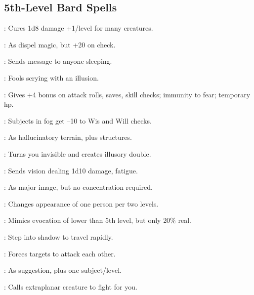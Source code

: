 \begin{multicols}{2}
\subsection{5th-Level Bard Spells}
\begin{description*}
\item[\linkspell{Cure Light Wounds, Mass}:] Cures 1d8 damage +1/level for many creatures.
\item[\linkspell{Dispel Magic, Greater}:] As dispel magic, but +20 on check.
\item[\linkspell{Dream}:] Sends message to anyone sleeping.
\item[\linkspell{False Vision}:] Fools scrying with an illusion.
\item[\linkspell{Heroism, Greater}:] Gives +4 bonus on attack rolls, saves, skill checks; immunity to fear; temporary hp.
\item[\linkspell{Mind Fog}:] Subjects in fog get –10 to Wis and Will checks.
\item[\linkspell{Mirage Arcana}:] As hallucinatory terrain, plus structures.
\item[\linkspell{Mislead}:] Turns you invisible and creates illusory double.
\item[\linkspell{Nightmare}:] Sends vision dealing 1d10 damage, fatigue.
\item[\linkspell{Persistent Image}:] As major image, but no concentration required.
\item[\linkspell{Seeming}:] Changes appearance of one person per two levels.
\item[\linkspell{Shadow Evocation}:] Mimics evocation of lower than 5th level, but only 20\% real.
\item[\linkspell{Shadow Walk}:] Step into shadow to travel rapidly.
\item[\linkspell{Song of Discord}:] Forces targets to attack each other.
\item[\linkspell{Suggestion, Mass}:] As suggestion, plus one subject/level.
\item[\linkspell{Summon Monster V}:] Calls extraplanar creature to fight for you.
\end{description*}


\end{multicols}
